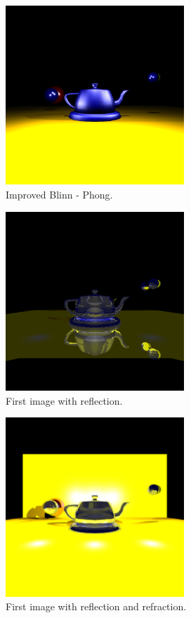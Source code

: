 \documentclass[12pt]{article}
\begin{document}
	\begin{figure}[h]
		\centering
		\includegraphics[width=0.6\textwidth]{image7.png}
		\caption{Improved Blinn - Phong.}
		\label{fig:image2}
	\end{figure}
	
	\begin{figure}[h]
		\centering
		\includegraphics[width=0.6\textwidth]{image12.png}
		\caption{First image with reflection.}
		\label{fig:image3}
	\end{figure}
	
	\begin{figure}[h]
		\centering
		\includegraphics[width=0.6\textwidth]{image19.png}
		\caption{First image with reflection and refraction.}
		\label{fig:image4}
	\end{figure}
	
\end{document}
